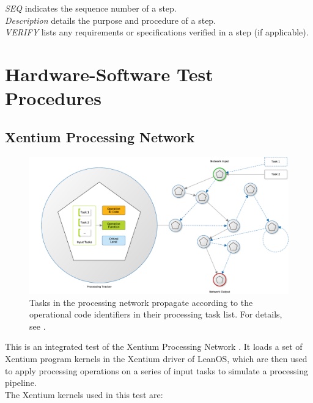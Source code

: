\noindent
\emph{SEQ} indicates the sequence number of a step.\\

\noindent
\emph{Description} details the purpose and procedure of a step. \\

\noindent
\emph{VERIFY} lists any requirements or specifications verified in a 
step (if applicable).\\

\newpage
\section{Hardware-Software Test Procedures}

\subsection{Xentium Processing Network}

\begin{figure}%
\begin{center}
	\includegraphics[width=1.0\columnwidth]{../usermanual/images/task_network}
	\caption{Tasks in the processing network propagate according to the
		 operational code identifiers in their processing task list.
	 	 For details, see \cite{leanosUM}.}
	\label{fig:task_network}
\end{center}
\end{figure}

This is an integrated test of the \gls{Xentium} Processing Network
. It loads a set of \gls{Xentium} program kernels in the
Xentium driver of LeanOS, which are then used to apply processing operations on
a series of input tasks to simulate a processing pipeline.\\

\noindent
The Xentium kernels used in this test are:

